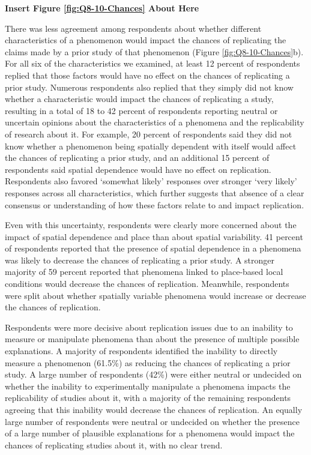 \documentclass[]{interact}
\theoremstyle{plain}%
\theoremstyle{definition}
\theoremstyle{remark}
\begin{document}
\begin{center}
\textbf{Insert Figure \ref{fig:Q8-10-Chances} About Here}
\end{center}

There was less agreement among respondents about whether different characteristics of a phenomenon would impact the chances of replicating the claims made by a prior study of that phenomenon (Figure \ref{fig:Q8-10-Chances}b). 
For all six of the characteristics we examined, at least 12 percent of respondents replied that those factors would have no effect on the chances of replicating a prior study.
Numerous respondents also replied that they simply did not know whether a characteristic would impact the chances of replicating a study, resulting in a total of 18 to 42 percent of respondents reporting neutral or uncertain opinions about the characteristics of a phenomena and the replicability of research about it.
For example, 20 percent of respondents said they did not know whether a phenomenon being spatially dependent with itself would affect the chances of replicating a prior study, and an additional 15 percent of respondents said spatial dependence would have no effect on replication. 
Respondents also favored `somewhat likely' responses over stronger `very likely' responses across all characteristics, which further suggests that absence of a clear consensus or understanding of how these factors relate to and impact replication.

Even with this uncertainty, respondents were clearly more concerned about the impact of spatial dependence and place than about spatial variability.
41 percent of respondents reported that the presence of spatial dependence in a phenomena was likely to decrease the chances of replicating a prior study.
A stronger majority of 59 percent reported that phenomena linked to place-based local conditions would decrease the chances of replication.
Meanwhile, respondents were split about whether spatially variable phenomena would increase or decrease the chances of replication.

Respondents were more decisive about replication issues due to an inability to measure or manipulate phenomena than about the presence of multiple possible explanations.
A majority of respondents identified the inability to directly measure a phenomenon (61.5\%) as reducing the chances of replicating a prior study.
A large number of respondents (42\%) were either neutral or undecided on whether the inability to experimentally manipulate a phenomena impacts the replicability of studies about it, with a majority of the remaining respondents agreeing that this inability would decrease the chances of replication. 
An equally large number of respondents were neutral or undecided on whether the presence of a large number of plausible explanations for a phenomena would impact the chances of replicating studies about it, with no clear trend.
\end{document}
